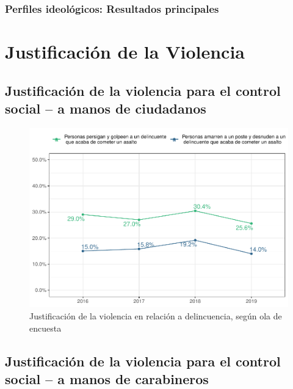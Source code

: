 \documentclass[
  12pt,
]{book}
\begin{document}
\hypertarget{perfiles-ideoluxf3gicos-resultados-principales}{%
\subsection{Perfiles ideológicos: Resultados principales}\label{perfiles-ideoluxf3gicos-resultados-principales}}

\hypertarget{justificaciuxf3n-de-la-violencia}{%
\chapter{Justificación de la Violencia}\label{justificaciuxf3n-de-la-violencia}}

\hypertarget{justificaciuxf3n-de-la-violencia-para-el-control-social-a-manos-de-ciudadanos}{%
\section{Justificación de la violencia para el control social -- a manos de ciudadanos}\label{justificaciuxf3n-de-la-violencia-para-el-control-social-a-manos-de-ciudadanos}}

\begin{figure}
\centering
\includegraphics{reporte-elsoc_files/figure-latex/just-vio-ola-1.pdf}
\caption{\label{fig:just-vio-ola}Justificación de la violencia en relación a delincuencia, según ola de encuesta}
\end{figure}

\hypertarget{justificaciuxf3n-de-la-violencia-para-el-control-social-a-manos-de-carabineros}{%
\section{Justificación de la violencia para el control social -- a manos de carabineros}\label{justificaciuxf3n-de-la-violencia-para-el-control-social-a-manos-de-carabineros}}
\end{document}
